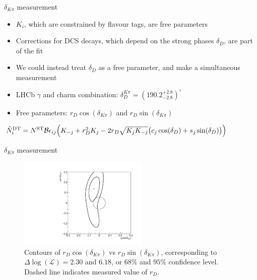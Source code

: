 \documentclass{beamer}
\begin{document}
\begin{frame}{$\delta_{K\pi}$ measurement}
  \begin{itemize}
    \setlength\itemsep{1.0em}
    \item{$K_i$, which are constrained by flavour tags, are free parameters}
    \item{Corrections for DCS decays, which depend on the strong phases $\delta_D$, are part of the fit}
    \item{We could instead treat $\delta_D$ as a free parameter, and make a simultaneous measurement}
    \item{LHCb $\gamma$ and charm combination: $\delta_D^{K\pi} = (190.2^{+2.8}_{-2.8})^\circ$}
    \item{Free parameters: $r_D\cos(\delta_{K\pi})$ and $r_D\sin(\delta_{K\pi})$}
  \end{itemize}
  \vspace{0.5cm}
  \begin{center}
    $\hat{N}^{\rm DT}_i = N^{\rm ST}\mathcal{B}\epsilon_{ij}\Big(K_{-j} + r_D^2K_j - 2r_D\sqrt{K_jK_{-j}}\big(c_j\cos(\delta_D) + s_j\sin(\delta_D)\big)\Big)$
  \end{center}
\end{frame}

\begin{frame}{$\delta_{K\pi}$ measurement}
  \begin{figure}
    \includegraphics[width=0.55\textwidth]{Plots/Contour_DeltaKpi.pdf}
    \caption{Contours of $r_D\cos(\delta_{K\pi})$ vs $r_D\sin(\delta_{K\pi})$, corresponding to $\Delta\log(\mathcal{L}) = 2.30$ and $6.18$, or $68\%$ and $95\%$ confidence level. Dashed line indicates measured value of $r_D$.}
  \end{figure}
\end{frame}
\end{document}
